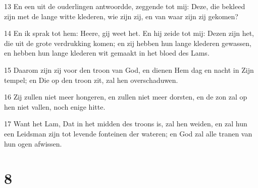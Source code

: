 \par 13 En een uit de ouderlingen antwoordde, zeggende tot mij: Deze, die bekleed zijn met de lange witte klederen, wie zijn zij, en van waar zijn zij gekomen?
\par 14 En ik sprak tot hem: Heere, gij weet het. En hij zeide tot mij: Dezen zijn het, die uit de grote verdrukking komen; en zij hebben hun lange klederen gewassen, en hebben hun lange klederen wit gemaakt in het bloed des Lams.
\par 15 Daarom zijn zij voor den troon van God, en dienen Hem dag en nacht in Zijn tempel; en Die op den troon zit, zal hen overschaduwen.
\par 16 Zij zullen niet meer hongeren, en zullen niet meer dorsten, en de zon zal op hen niet vallen, noch enige hitte.
\par 17 Want het Lam, Dat in het midden des troons is, zal hen weiden, en zal hun een Leidsman zijn tot levende fonteinen der wateren; en God zal alle tranen van hun ogen afwissen.

\chapter{8}

